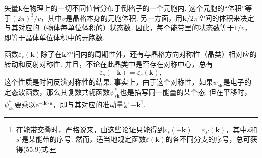 矢量$\bm k$在物理上的一切不同值皆分布于倒格子的一个元胞内. 这个元胞的“体积”等于$(2\pi)^3/v$，其中$v$是晶格本身的元胞体积. 另一方面，用$\bm k/2\pi$空间的体积来决定与其对应的（物体每单位体积的）状态数. 因此，每个能带里的状态数等于$1/v$，即等于晶体单位体积中的元胞数.

函数$\varepsilon_s(\bm k)$除了在$\bm k$空间内的周期性外，还有与晶格方向对称性（晶类）相对应的转动和反射对称性. 并且，不论在此晶类中是否存在对称中心，总有
\begin{equation}
\varepsilon_s(-\bm k)=\varepsilon_s(\bm k),
\label{55.9}
\end{equation}
这个性质是时间反演对称性的结果. 事实上，由于这个对称性，如果$\psi_{s\bm k}$是电子的定态波函数，那么其复数共轭函数$\psi^{*}_{s\bm k}$也是描写同一能量的某个态. 但在平移时，$\psi^{*}_{s\bm k}$要乘以$\mathrm e^{-\mathrm i\bm k\cdot\bm a}$，即与其对应的准动量是$-\bm k$\footnote{在能带交叠时，严格说来，由这些论证只能得到$\varepsilon_s(-\bm k)=\varepsilon_{s'}(\bm k)$，其中$s$和$s'$是某能带的序号. 然而，适当地规定函数$\varepsilon(\bm k)$的各不同分支的序号，总可获得(55.9)式.}.

